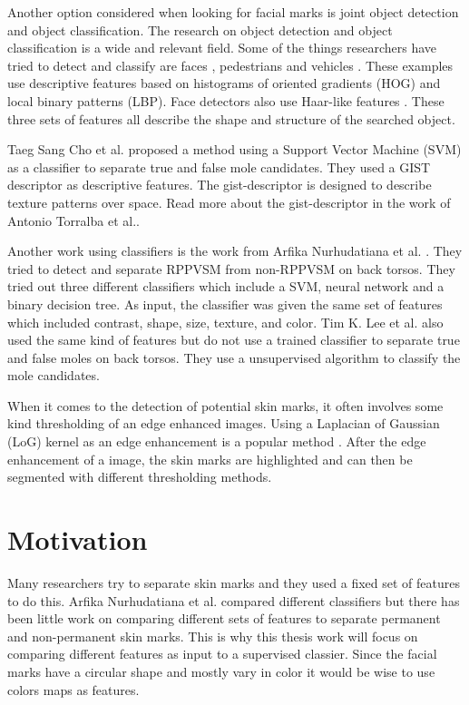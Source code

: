 Another option considered when looking for facial marks is joint object detection and object classification. The research on object detection and object classification is a wide and relevant field. Some of the things researchers have tried to detect and classify are faces \cite{facedetection_LBP}, pedestrians \cite{pedestrian_detection} and vehicles \cite{vehicle_hog}. These examples use descriptive features based on histograms of oriented gradients (HOG) and local binary patterns (LBP). Face detectors also use Haar-like features \cite{face_detection}. These three sets of features all describe the shape and structure of the searched object.

Taeg Sang Cho et al.\cite{reliable_mole} proposed a method using a Support Vector Machine (SVM) as a classifier to separate true and false mole candidates. They used a GIST  descriptor as descriptive features. The gist-descriptor is designed to describe texture patterns over space. Read more about the gist-descriptor in the work of Antonio Torralba et al.\cite{gist_descriptor}. 

Another work using classifiers is the work from Arfika Nurhudatiana et al. \cite{torso_RPPVSM}. They tried to detect and separate RPPVSM from non-RPPVSM on back torsos. They tried out three different classifiers which include a SVM, neural network and a binary decision tree. As input, the classifier was given the same set of features which included contrast, shape, size, texture, and color. Tim K. Lee et al.\cite{torso_mole} also used the same kind of features but do not use a trained classifier to separate true and false moles on back torsos. They use a unsupervised algorithm to classify the mole candidates. 

When it comes to the detection of potential skin marks, it often involves some kind thresholding of an edge enhanced images. Using a Laplacian of Gaussian (LoG) kernel as an edge enhancement is a popular method \cite{tattoos,face_matching}. After the edge enhancement of a image, the skin marks are highlighted and can then be segmented with different thresholding methods. 

\section{Motivation}

Many researchers \cite{reliable_mole,torso_RPPVSM,torso_mole} try to separate skin marks and they used a fixed set of features to do this. Arfika Nurhudatiana et al. compared different classifiers but there has been little work on comparing different sets of features to separate permanent and non-permanent skin marks. This is why this thesis work will focus on comparing different features as input to a supervised classier. Since the facial marks have a circular shape and mostly vary in color it would be wise to use colors maps as features. 

